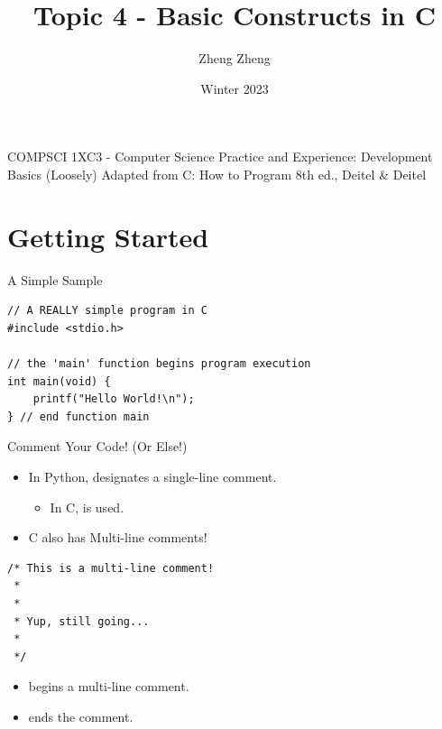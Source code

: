 \documentclass[11pt]{beamer}
\author{Zheng Zheng}
\title{Topic 4 - Basic Constructs in C}
\institute{McMaster University}
\date{Winter 2023}
\let\OldTexttt\texttt
\renewcommand{\texttt}[1]{\OldTexttt{\color{teal}{#1}}}
\begin{document}
\begin{frame}
\center
COMPSCI 1XC3 - Computer Science Practice and Experience:
Development Basics
\titlepage
(Loosely) Adapted from C: How to Program 8th ed., Deitel \& Deitel
\end{frame}

\begin{frame}
\tableofcontents
\end{frame}



\section[Intro]{Getting Started}
\begin{frame}[fragile=singleslide]{A Simple Sample}
\begin{lstlisting}[style=C]
// A REALLY simple program in C
#include <stdio.h>

// the 'main' function begins program execution
int main(void) {
	printf("Hello World!\n");
} // end function main
\end{lstlisting}
\end{frame}

\begin{frame}[fragile=singleslide]{Comment Your Code! (Or Else!)}
\begin{itemize}
\item In Python, \texttt{\#} designates a single-line comment.
\begin{itemize}
\item In C, \texttt{//} is used.
\end{itemize}
\item C also has Multi-line comments! 
\end{itemize}
\begin{lstlisting}[style = C]
/* This is a multi-line comment! 
 * 
 *
 * Yup, still going...
 *
 */
\end{lstlisting}
\begin{itemize}
\item \texttt{\textbf{/*}} begins a multi-line comment.
\item \texttt{\textbf{*/}} ends the comment.  
\end{itemize}
\end{frame}
\end{document}
